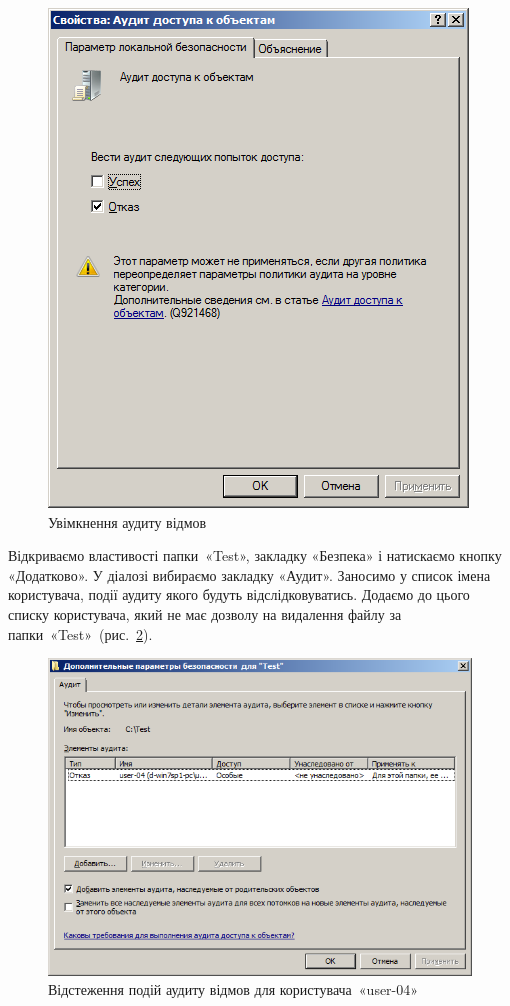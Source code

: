 \documentclass[
	a4paper,
	oneside,
	DIV = 12,
	fontsize = 13pt,
	headings = normal,
]{scrartcl}
\begin{document}
			\begin{figure}[!htbp]
				\centering
				\includegraphics[height = 12\baselineskip]{../01-solution/y03s01-pcdiag-lab-08-p17.png}
				\caption{Увімкнення аудиту відмов}
				\label{fig:audit-enabled}
			\end{figure}

			Відкриваємо властивості папки~«\textenglish{Test}», закладку «Безпека» і натискаємо кнопку «Додатково». У діалозі вибираємо закладку «Аудит». Заносимо у список імена користувача, події аудиту якого будуть відслідковуватись. Додаємо до цього списку користувача, який не має дозволу на видалення файлу за папки~«\textenglish{Test}»~(рис.~\ref{fig:dir-audit-enabled}).

			\begin{figure}[!htbp]
				\centering
				\includegraphics[height = 14\baselineskip]{../01-solution/y03s01-pcdiag-lab-08-p18.png}
				\caption{Відстеження подій аудиту відмов для користувача~«\textenglish{user-04}»}
				\label{fig:dir-audit-enabled}
			\end{figure}
\end{document}
